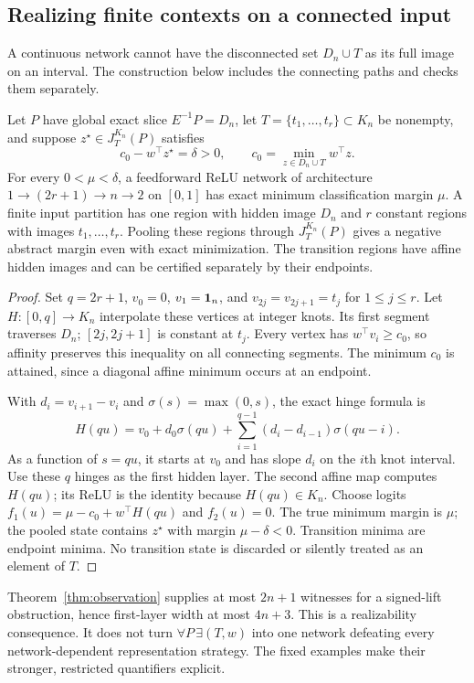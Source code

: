 \subsection{Realizing finite contexts on a connected input}
A continuous network cannot have the disconnected set $D_n\cup T$ as its full image on an interval. The construction below includes the connecting paths and checks them separately.

\begin{theorem}\label{thm:relu-realization}
Let $P$ have global exact slice $E^{-1}P=D_n$, let $T=\{t_1,\ldots,t_r\}\subset K_n$ be nonempty, and suppose $z^\star\in J_T^{K_n}(P)$ satisfies
\[
c_0-w^\top z^\star=\delta>0,\qquad c_0=\min_{z\in D_n\cup T}w^\top z.
\]
For every $0<\mu<\delta$, a feedforward ReLU network of architecture $1\to(2r+1)\to n\to2$ on $[0,1]$ has exact minimum classification margin $\mu$. A finite input partition has one region with hidden image $D_n$ and $r$ constant regions with images $t_1,\ldots,t_r$. Pooling these regions through $J_T^{K_n}(P)$ gives a negative abstract margin even with exact minimization. The transition regions have affine hidden images and can be certified separately by their endpoints.
\end{theorem}
\begin{proof}
Set $q=2r+1$, $v_0=0$, $v_1=\mathbf 1_n$, and $v_{2j}=v_{2j+1}=t_j$ for $1\le j\le r$. Let $H:[0,q]\to K_n$ interpolate these vertices at integer knots. Its first segment traverses $D_n$; $[2j,2j+1]$ is constant at $t_j$. Every vertex has $w^\top v_i\ge c_0$, so affinity preserves this inequality on all connecting segments. The minimum $c_0$ is attained, since a diagonal affine minimum occurs at an endpoint.

With $d_i=v_{i+1}-v_i$ and $\sigma(s)=\max(0,s)$, the exact hinge formula is
\begin{equation}\label{eq:relu-hinge}
H(qu)=v_0+d_0\sigma(qu)+\sum_{i=1}^{q-1}(d_i-d_{i-1})\sigma(qu-i).
\end{equation}
As a function of $s=qu$, it starts at $v_0$ and has slope $d_i$ on the $i$th knot interval. Use these $q$ hinges as the first hidden layer. The second affine map computes $H(qu)$; its ReLU is the identity because $H(qu)\in K_n$. Choose logits $f_1(u)=\mu-c_0+w^\top H(qu)$ and $f_2(u)=0$. The true minimum margin is $\mu$; the pooled state contains $z^\star$ with margin $\mu-\delta<0$. Transition minima are endpoint minima. No transition state is discarded or silently treated as an element of $T$.
\end{proof}

Theorem~\ref{thm:observation} supplies at most $2n+1$ witnesses for a signed-lift obstruction, hence first-layer width at most $4n+3$. This is a realizability consequence. It does not turn $\forall P\,\exists(T,w)$ into one network defeating every network-dependent representation strategy. The fixed examples make their stronger, restricted quantifiers explicit.
